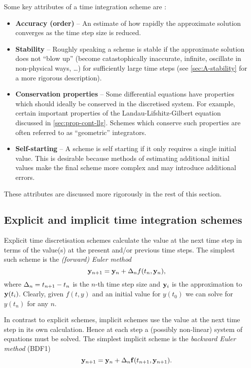Some key attributes of a time integration scheme are \cite{Atkinson2009}:
\begin{itemize}
\item \textbf{Accuracy (order)} -- An estimate of how rapidly the approximate solution converges as the time step size is reduced.

\item \textbf{Stability} -- Roughly speaking a scheme is stable if the approximate solution does not ``blow up'' (\ie become catastophically inaccurate, infinite, oscillate in non-physical ways, \ldots) for sufficiently large time steps (see \cref{sec:A-stability} for a more rigorous description).

\item \textbf{Conservation properties} -- Some differential equations have properties which should ideally be conserved in the discretised system.
For example, certain important properties of the Landau-Lifshitz-Gilbert equation discussed in \cref{sec:prop-cont-llg}.
Schemes which conserve such properties are often referred to as ``geometric'' integrators.

\item \textbf{Self-starting} -- A scheme is self starting if it only requires a single initial value.
This is desirable because methods of estimating additional initial values make the final scheme more complex and may introduce additional errors.
\end{itemize}

These attributes are discussed more rigorously in the rest of this section.

\subsection{Explicit and implicit time integration schemes}
\label{sec:explicit-vs-implicit-schemes}

Explicit time discretisation schemes calculate the value at the next time step in terms of the value(s) at the present and/or previous time steps.
The simplest such scheme is the \emph{(forward) Euler method}
\begin{equation}
  \label{eq:44}
  \mathbf{y}_{n+1} = \mathbf{y}_n + \Delta_{n} f(t_n, \mathbf{y}_n),
\end{equation}
where $\Delta_{n} = t_{n+1} - t_n$ is the $n$-th time step size and $\mathbf{y}_i$ is the approximation to $\mathbf{y}(t_i)$.
Clearly, given $f(t,y)$ and an initial value for $y(t_0)$ we can solve for $y(t_n)$ for any $n$.

In contrast to explicit schemes, implicit schemes use the value at the next time step in its own calculation.
Hence at each step a (possibly non-linear) system of equations must be solved.
The simplest implicit scheme is the \emph{backward Euler method} (BDF1)
\begin{equation}
  \label{eq:bdf1-definition}
  \mathbf{y}_{n+1} = \mathbf{y}_n + \Delta_{n} {\mathbf{f}{\left( t_{n+1}, \mathbf{y}_{n+1} \right)}}.
\end{equation}

